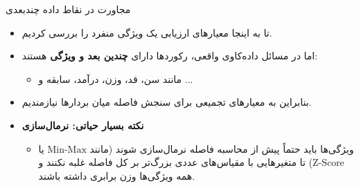 \begin{frame}{مجاورت در نقاط داده چندبعدی}{}
  \begin{itemize}
    \setlength{\itemsep}{6pt}
    \item تا به اینجا معیارهای ارزیابی یک ویژگی منفرد را بررسی کردیم.
    \item اما در مسائل داده‌کاوی واقعی، رکوردها دارای \textbf{چندین بعد و ویژگی} هستند:
    \begin{itemize}
      \item مانند سن، قد، وزن، درآمد، سابقه و ...
    \end{itemize}
    \item بنابراین به معیارهای تجمیعی برای سنجش فاصله میان بردارها نیازمندیم.
    \item \textbf{نکته بسیار حیاتی: نرمال‌سازی }
    \begin{itemize}
      \item ویژگی‌ها باید حتماً پیش از محاسبه فاصله نرمال‌سازی شوند (مانند $\text{Min-Max}$ یا $\text{Z-Score}$) تا متغیرهایی با مقیاس‌های عددی بزرگ‌تر بر کل فاصله غلبه نکنند و همه ویژگی‌ها وزن برابری داشته باشند.
    \end{itemize}
  \end{itemize}
\end{frame}

